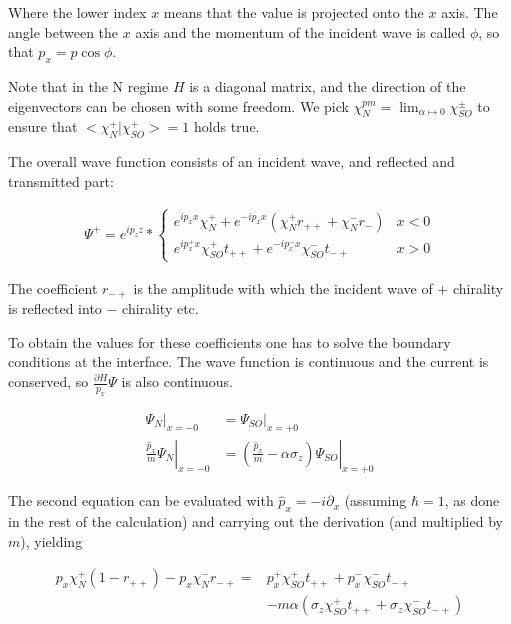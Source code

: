 \documentclass[11pt]{article}
\begin{document}
Where the lower index $x$ means that the value is projected onto the
$x$ axis. The angle between the $x$ axis and the momentum of the
incident wave is called $\phi$, so that $p_x = p \cos \phi$.

Note that in the N regime $H$ is a diagonal matrix, and the direction
of the eigenvectors can be chosen with some freedom. We pick
$\chi_N^{pm} = \lim_{\alpha \mapsto 0} \chi_{SO}^{\pm}$ to ensure that
$<\chi_N^+|\chi_{SO}^+> = 1$ holds true.


The overall wave function consists of an incident wave, 
and reflected and transmitted part:

\begin{align}
    \Psi^+ = e^{i p_z z} * \left\{
        \begin{array}{ll}
            e^{i p_x x} \chi_N^+ + e^{- i p_x x} (\chi_N^+ r_{++} +
                    \chi_N^- r_{-})     & x < 0\\
            e^{i p_x^+ x} \chi_{SO}^+ t_{++} + e^{-i p_x^- x}
            \chi_{SO}^- t_{-+}          & x > 0
        \end{array} \right.
\end{align}

The coefficient $r_{-+}$ is the amplitude with which the incident wave
of $+$ chirality is reflected into $-$ chirality etc.

To obtain the values for these coefficients one has to solve the
boundary conditions at the interface. The wave function is continuous
and the current is conserved, so $\frac{\partial H}{p_x} \Psi$ is also
continuous.

\begin{align}
    \Psi_N|_{x = -0}    &= \Psi_{SO}|_{x = +0}\\
    \left.\frac{\hat p_x}{m} \Psi_N\right|_{x = -0}
                        &= \left. \left(\frac{\hat p_x}{m} -\alpha \sigma_z\right)
                                    \Psi_{SO}\right|_{x = +0}
\end{align}

The second equation can be evaluated with $\hat p_x = -i \partial_x$
(assuming $\hbar = 1$, as done in the rest of the calculation) and
carrying out the derivation (and multiplied by $m$), yielding

\begin{align}
    p_x \chi_N^+ (1 - r_{++}) - p_x \chi_N^- r_{-+}
        =& p_x^+ \chi_{SO}^+ t_{++} + p_x^- \chi_{SO}^- t_{-+} \nonumber\\
         &   - m \alpha \left(  \sigma_z \chi_{SO}^+ t_{++}
                            + \sigma_z \chi_{SO}^- t_{-+} \right)
\end{align}
\end{document}
